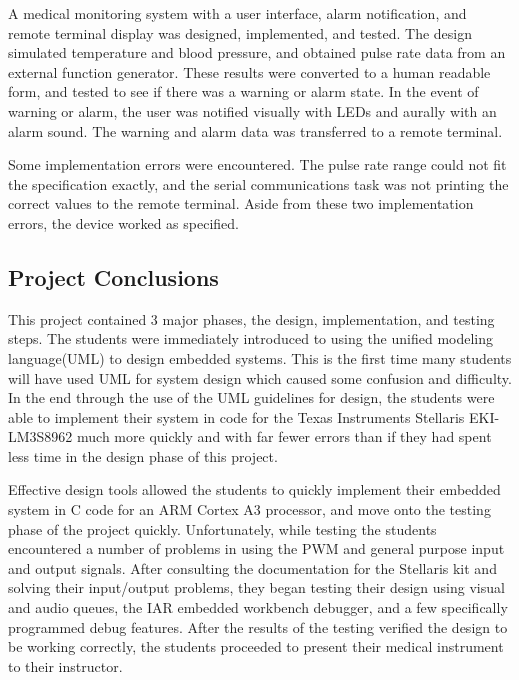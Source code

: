 \documentclass[12pt]{article} %
\begin{document}
    A medical monitoring system with a user interface, alarm notification, and
    remote terminal display was designed, implemented, and tested.  The design
    simulated temperature and blood pressure, and obtained pulse rate data from
    an external function generator.  These results were converted to a human
    readable form, and tested to see if there was a warning or alarm state.
    In the event of warning or alarm, the user was notified visually with LEDs
    and aurally with an alarm sound.  The warning and alarm data was transferred
    to a remote terminal.  

    Some implementation errors were encountered.  The pulse rate range could
    not fit the specification exactly, and the serial communications task was
    not printing the correct values to the remote terminal. Aside from these
    two implementation errors, the device worked as specified.

    \subsection{Project Conclusions} 
    
    This project contained 3 major phases, the design, implementation, and
    testing steps. The students were immediately introduced to using the
    unified modeling language(UML) to design embedded systems. This is the
    first time many students will have used UML for system design which caused
    some confusion and difficulty. In the end through the use of the UML
    guidelines for design, the students were able to implement their system in
    code for the Texas Instruments Stellaris EKI-LM3S8962 much more quickly and
    with far fewer errors than if they had spent less time in the design phase
    of this project. 

    Effective design tools allowed the students to quickly implement their embedded
    system in C code for an ARM Cortex A3 processor, and move onto the testing
    phase of the project quickly. Unfortunately, while testing the students
    encountered a number of problems in using the PWM and general purpose input and
    output signals. After consulting the documentation for the Stellaris kit and
    solving their input/output problems, they began testing their design using
    visual and audio queues, the IAR embedded workbench debugger, and a few
    specifically programmed debug features. After the results of the testing
    verified the design to be working correctly, the students proceeded to present
    their medical instrument to their instructor.
\end{document}
